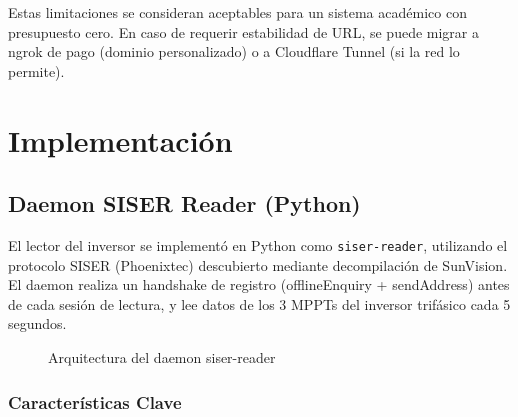 \documentclass[12pt,a4paper]{article}
\begin{document}
Estas limitaciones se consideran aceptables para un sistema acad\'emico con presupuesto cero. En caso de requerir estabilidad de URL, se puede migrar a ngrok de pago (dominio personalizado) o a Cloudflare Tunnel (si la red lo permite).

\section{Implementaci\'on}

\subsection{Daemon SISER Reader (Python)}

El lector del inversor se implement\'o en Python como \texttt{siser-reader}, utilizando el protocolo SISER (Phoenixtec) descubierto mediante decompilaci\'on de SunVision. El daemon realiza un handshake de registro (offlineEnquiry + sendAddress) antes de cada sesi\'on de lectura, y lee datos de los 3 MPPTs del inversor trif\'asico cada 5 segundos.

\begin{figure}[H]
\centering
{}
\caption{Arquitectura del daemon siser-reader}
\label{fig:siser-reader-arch}
\end{figure}

\subsubsection{Caracter\'isticas Clave}
\end{document}
